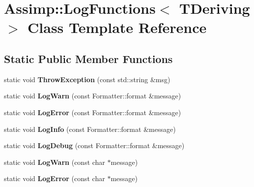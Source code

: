 \hypertarget{class_assimp_1_1_log_functions}{\section{Assimp\+:\+:Log\+Functions$<$ T\+Deriving $>$ Class Template Reference}
\label{class_assimp_1_1_log_functions}
}
\subsection*{Static Public Member Functions}
\begin{DoxyCompactItemize}
\item 
\hypertarget{class_assimp_1_1_log_functions_abcb90e8fd8f88086b1af4c0fe89ffcd6}{static void {\bfseries Throw\+Exception} (const std\+::string \&msg)}\label{class_assimp_1_1_log_functions_abcb90e8fd8f88086b1af4c0fe89ffcd6}

\item 
\hypertarget{class_assimp_1_1_log_functions_a6652353f8fe149aa71c3cad6c2b39e50}{static void {\bfseries Log\+Warn} (const Formatter\+::format \&message)}\label{class_assimp_1_1_log_functions_a6652353f8fe149aa71c3cad6c2b39e50}

\item 
\hypertarget{class_assimp_1_1_log_functions_af9ebd993be40f7b1605272335acda7f6}{static void {\bfseries Log\+Error} (const Formatter\+::format \&message)}\label{class_assimp_1_1_log_functions_af9ebd993be40f7b1605272335acda7f6}

\item 
\hypertarget{class_assimp_1_1_log_functions_a264a01316a64b747714806451b99b25f}{static void {\bfseries Log\+Info} (const Formatter\+::format \&message)}\label{class_assimp_1_1_log_functions_a264a01316a64b747714806451b99b25f}

\item 
\hypertarget{class_assimp_1_1_log_functions_ac46839f3d6ce18f82e22781a068f3fbd}{static void {\bfseries Log\+Debug} (const Formatter\+::format \&message)}\label{class_assimp_1_1_log_functions_ac46839f3d6ce18f82e22781a068f3fbd}

\item 
\hypertarget{class_assimp_1_1_log_functions_a9f093926195510b80f8ed3c8696c62f1}{static void {\bfseries Log\+Warn} (const char $\ast$message)}\label{class_assimp_1_1_log_functions_a9f093926195510b80f8ed3c8696c62f1}

\item 
\hypertarget{class_assimp_1_1_log_functions_aeb6f4cd81389a2ae8213ab013dd79e62}{static void {\bfseries Log\+Error} (const char $\ast$message)}\label{class_assimp_1_1_log_functions_aeb6f4cd81389a2ae8213ab013dd79e62}


\end{DoxyCompactItemize}
